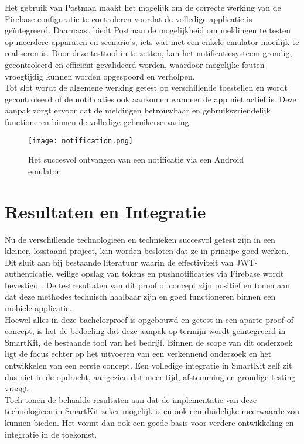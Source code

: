 Het gebruik van Postman maakt het mogelijk om de correcte werking van de Firebase-configuratie te controleren voordat de volledige applicatie is geïntegreerd. Daarnaast biedt Postman de mogelijkheid om meldingen te testen op meerdere apparaten en scenario's, iets wat met een enkele emulator moeilijk te realiseren is. Door deze testtool in te zetten, kan het notificatiesysteem grondig, gecontroleerd en efficiënt gevalideerd worden, waardoor mogelijke fouten vroegtijdig kunnen worden opgespoord en verholpen.\\

Tot slot wordt de algemene werking getest op verschillende toestellen en wordt gecontroleerd of de notificaties ook aankomen wanneer de app niet actief is. Deze aanpak zorgt ervoor dat de meldingen betrouwbaar en gebruiksvriendelijk functioneren binnen de volledige gebruikerservaring. \\

\begin{figure}[H]
    \centering
    \texttt{[image: notification.png]}
    \caption{Het succesvol ontvangen van een notificatie via een Android emulator}
    \label{fig:notification}
\end{figure}

\section{Resultaten en Integratie}

Nu de verschillende technologieën en technieken succesvol getest zijn in een kleiner, losstaand project, kan worden besloten dat ze in principe goed werken. Dit sluit aan bij bestaande literatuur waarin de effectiviteit van JWT-authenticatie, veilige opslag van tokens en pushnotificaties via Firebase wordt bevestigd \autocite{Gao2023, Wohllebe2021}. De testresultaten van dit proof of concept zijn positief en tonen aan dat deze methodes technisch haalbaar zijn en goed functioneren binnen een mobiele applicatie.\\

Hoewel alles in deze bachelorproef is opgebouwd en getest in een aparte proof of concept, is het de bedoeling dat deze aanpak op termijn wordt geïntegreerd in SmartKit, de bestaande tool van het bedrijf. Binnen de scope van dit onderzoek ligt de focus echter op het uitvoeren van een verkennend onderzoek en het ontwikkelen van een eerste concept. Een volledige integratie in SmartKit zelf zit dus niet in de opdracht, aangezien dat meer tijd, afstemming en grondige testing vraagt.\\

Toch tonen de behaalde resultaten aan dat de implementatie van deze technologieën in SmartKit zeker mogelijk is en ook een duidelijke meerwaarde zou kunnen bieden. Het vormt dan ook een goede basis voor verdere ontwikkeling en integratie in de toekomst.
